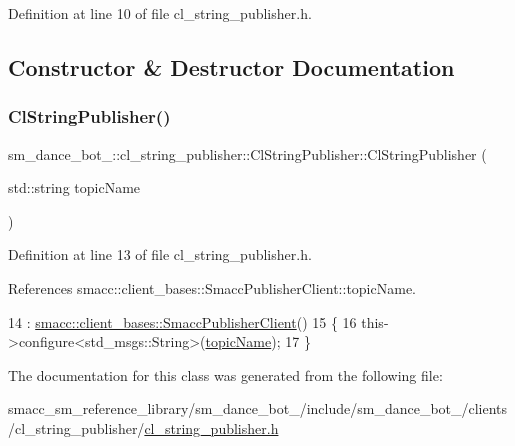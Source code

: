 Definition at line 10 of file cl\+\_\+string\+\_\+publisher.\+h.



\subsection{Constructor \& Destructor Documentation}
\mbox{\label{classsm__dance__bot__2_1_1cl__string__publisher_1_1ClStringPublisher_ab946a48d8c6ba33ce49623d75268d775}} 
\subsubsection{\texorpdfstring{Cl\+String\+Publisher()}{ClStringPublisher()}}
{\footnotesize\ttfamily sm\+\_\+dance\+\_\+bot\+\_\+::cl\+\_\+string\+\_\+publisher\+::\+Cl\+String\+Publisher\+::\+Cl\+String\+Publisher (\begin{DoxyParamCaption}\item[{std\+::string}]{topic\+Name }\end{DoxyParamCaption})\hspace{0.3cm}{\ttfamily [inline]}}



Definition at line 13 of file cl\+\_\+string\+\_\+publisher.\+h.



References smacc\+::client\+\_\+bases\+::\+Smacc\+Publisher\+Client\+::topic\+Name.


\begin{DoxyCode}
14         : \hyperlink{classsmacc_1_1client__bases_1_1SmaccPublisherClient}{smacc::client\_bases::SmaccPublisherClient}()
15     \{
16         this->configure<std\_msgs::String>(\hyperlink{classsmacc_1_1client__bases_1_1SmaccPublisherClient_a8b8d98aef9b3b3a441005d2cb17b4fcc}{topicName});
17     \}
\end{DoxyCode}


The documentation for this class was generated from the following file\+:\begin{DoxyCompactItemize}
\item 
smacc\+\_\+sm\+\_\+reference\+\_\+library/sm\+\_\+dance\+\_\+bot\+\_/include/sm\+\_\+dance\+\_\+bot\+\_/clients/cl\+\_\+string\+\_\+publisher/\hyperlink{2_2include_2sm__dance__bot__2_2clients_2cl__string__publisher_2cl__string__publisher_8h}{cl\+\_\+string\+\_\+publisher.\+h}\end{DoxyCompactItemize}
